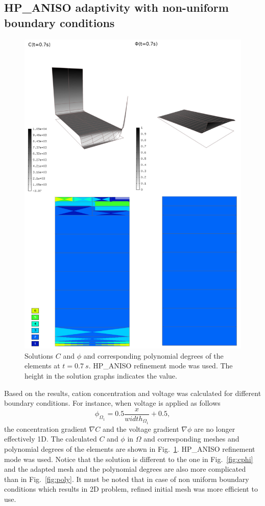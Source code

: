 \subsection{HP\_ANISO adaptivity with non-uniform boundary conditions}
\begin{figure}[!ht]
  \begin{centering}
  \includegraphics[width=.75\columnwidth]{cphiorders}
  \caption{\label{fig:cphi-orders} Solutions $C$ and $\phi$
  and corresponding polynomial degrees of the elements at
  $t=0.7\ s$. HP\_ANISO refinement mode was used. The height
  in the solution graphs indicates the value.}
  \end{centering}
\end{figure}

Based on the results, cation concentration and voltage was calculated
for different boundary conditions.
For instance, when voltage is applied as follows
\begin{equation}
  \phi_{\Omega_1}=0.5\frac{x}{width_{\Omega_1}}+0.5,
\end{equation}
the concentration gradient $\nabla C$ and the voltage gradient $\nabla \phi$ are no
longer effectively 1D.
The calculated $C$ and $\phi$ in $\Omega$ and corresponding meshes and polynomial
degrees of the elements are shown in Fig.~\ref{fig:cphi-orders}.
HP\_ANISO refinement mode was used. Notice that the solution
is different to the one in Fig.~\ref{fig:cphi} and the adapted mesh and the
polynomial degrees are also more complicated than in Fig.~\ref{fig:poly}.
It must be noted that in case of non uniform boundary conditions which
results in 2D problem, refined initial mesh was more efficient to use.

